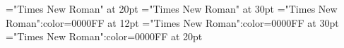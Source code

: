 \documentclass[a4paper]{article}
\begin{document}
 
\pagestyle{plain} 
\font\xitemen="Times New Roman" at 20pt
\font\xitempt="Times New Roman" at 30pt
\font\entry="Times New Roman":color=0000FF at 12pt
\font\xitemptentry="Times New Roman":color=0000FF at 30pt
\font\xitemenentry="Times New Roman":color=0000FF at 20pt

\pagestyle{fancy} 

\end{document}

